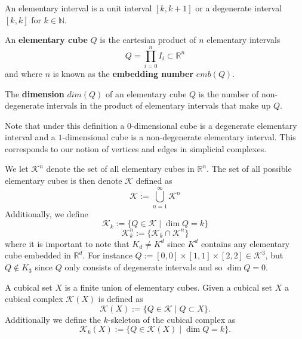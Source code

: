 \begin{example}
\begin{definition}
An elementary interval is a unit interval $[k,k+1]$ or a degenerate interval $[k,k]$ for $k \in \mathbb{N}$.
\end{definition}

\begin{definition}
  An \textbf{elementary cube} $Q$ is the cartesian product of $n$ elementary intervals
  \[Q = \prod^{n}_{i=0} I_{i} \subset \mathbb{R}^{n}\]
  and where $n$ is known as the \textbf{embedding number} $emb(Q)$.
\end{definition}

\begin{definition}
The \textbf{dimension} $dim(Q)$ of an elementary cube $Q$ is the number of non-degenerate intervals in the product of elementary intervals that make up $Q$.
\end{definition}

Note that under this definition a $0$-dimensional cube is a degenerate elementary interval and a $1$-dimensional cube is a non-degenerate elementary interval. This corresponds to our notion of vertices and edges in simplicial complexes.

We let $\mathcal{K}^{n}$ denote the set of all elementary cubes in $\mathbb{R}^{n}$. The set of all possible elementary cubes is then denote $\mathcal{K}$ defined as
\[ \mathcal{K}:= \bigcup^{\infty}_{n=1} \mathcal{K}^{n} \]
Additionally, we define
\[ \mathcal{K}_{k} := \{ Q \in \mathcal{K} \mid \dim Q = k \}\]
\[ \mathcal{K}^{n}_{k} := \{ \mathcal{K}_{k} \cap \mathcal{K}^{n} \}\]
where it is important to note that $K_{d} \neq K^{d}$ since $K^{d}$ contains any elementary cube embedded in $\mathbb{R}^{d}$. For instance $Q:=[0,0] \times [1,1] \times [2,2] \in \mathcal{K}^{3}$, but $Q \not \in K_{3}$ since $Q$ only consists of degenerate intervals and so $\dim Q = 0$.


\begin{definition}
  A cubical set $X$ is a finite union of elementary cubes. Given a cubical set $X$ a cubical complex $\mathcal{K}(X)$ is defined as
  \[ \mathcal{K}(X):= \{Q \in \mathcal{K} \mid Q \subset X\}.\]
  Additionally we define the $k$-skeleton of the cubical complex as
  \[ \mathcal{K}_{k}(X):= \{ Q \in \mathcal{K}(X) \mid \dim Q = k \}.\]
\end{definition}


\end{example}
